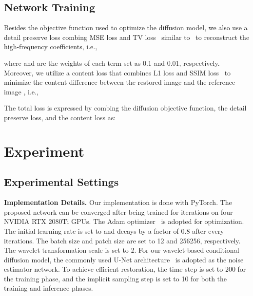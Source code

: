 \subsection{Network Training}\label{subsec:Network Training}
Besides the objective function  used to optimize the diffusion model, we also use a detail preserve loss  combing MSE loss and TV loss~\cite{TV} similar to~\cite{RUAS} to reconstruct the high-frequency coefficients, i.e.,

where  and  are the weights of each term set as 0.1 and 0.01, respectively. Moreover, we utilize a content loss  that combines L1 loss and SSIM loss~\cite{SSIM} to minimize the content difference between the restored image  and the reference image , i.e.,

The total loss  is expressed by combing the diffusion objective function, the detail preserve loss, and the content loss as:


\section{Experiment}\label{sec:experiment}
\subsection{Experimental Settings}\label{subsec:Experimental Settings}
\textbf{Implementation Details.} Our implementation is done with PyTorch. The proposed network can be converged after being trained for  iterations on four NVIDIA RTX 2080Ti GPUs. The Adam optimizer~\cite{Adam} is adopted for optimization. The initial learning rate is set to  and decays by a factor of 0.8 after every  iterations. The batch size and patch size are set to 12 and 256256, respectively. The wavelet transformation scale  is set to 2. For our wavelet-based conditional diffusion model, the commonly used U-Net architecture~\cite{Unet} is adopted as the noise estimator network. To achieve efficient restoration, the time step  is set to 200 for the training phase, and the implicit sampling step  is set to 10 for both the training and inference phases. 

